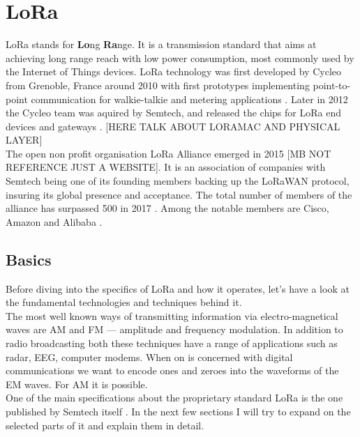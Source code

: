 \chapter{LoRa}

LoRa stands for \textbf{Lo}ng \textbf{Ra}nge. It is a transmission standard that aims at achieving long range reach with low power
consumption, most commonly used by the Internet of Things devices.
LoRa technology was first developed by Cycleo from Grenoble, France around 2010 with first prototypes implementing point-to-point communication for walkie-talkie and metering applications \cite{trinity_panel}. Later in 2012 the Cycleo team was aquired by Semtech, and released the chips for LoRa end devices and gateways \cite{origins}. [HERE TALK ABOUT LORAMAC AND PHYSICAL LAYER]\\

The open non profit organisation LoRa Alliance emerged in 2015\cite{alliance} [MB NOT REFERENCE JUST A WEBSITE]. 
It is an association of companies with Semtech being one of
its founding members \cite{alliance_founder} backing up the LoRaWAN protocol, insuring its
global presence and acceptance. The total number of members of the alliance has surpassed 500 in 2017 \cite{500_members}. Among the notable members are Cisco, Amazon and Alibaba \cite{alliance_members}.\\

\section{Basics}

Before diving into the specifics of LoRa and how it operates, let's have a look at the fundamental technologies and techniques behind it. \\

The most well known ways of transmitting information 
via electro-magnetical waves are AM and FM — amplitude and frequency modulation. In addition to radio broadcasting both these techniques have a range of applications such as radar, EEG, computer modems. When 
on is concerned with digital communications we want to 
encode ones and zeroes into the waveforms of the EM waves. For AM it is possible. \\

One of the main specifications about the proprietary standard LoRa is the one published by Semtech itself \cite{semtech_spec}. In the next few sections I will try to expand on the selected parts of it and explain them in detail.

